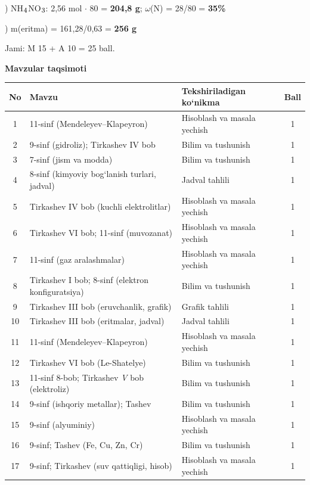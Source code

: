 \documentclass[11pt,a4paper]{article}
\renewcommand{\textsubscript}[1]{\ensuremath{_{\text{\fontsize{8}{8}\selectfont #1}}}}
\begin{document}
) NH\textsubscript{4}NO\textsubscript{3}: 2,56 mol $\cdot$ 80 = \textbf{204,8 g}; $\omega$(N) = 28/80 = \textbf{35\%}\par
{}) m(eritma) = 161,28/0,63 = \textbf{256 g}\par
\noindent Jami: M 15 + A 10 = 25 ball.\par
\par\bigskip\noindent\textbf{Mavzular taqsimoti}\par\smallskip
{\small\noindent\begin{longtable}{|c|p{7.2cm}|p{5.4cm}|c|}\hline \textbf{No} & \textbf{Mavzu} & \textbf{Tekshiriladigan ko`nikma} & \textbf{Ball}\\\hline
1 & 11-sinf (Mendeleyev--Klapeyron) & Hisoblash va masala yechish & 1\\\hline
2 & 9-sinf (gidroliz); Tirkashev IV bob & Bilim va tushunish & 1\\\hline
3 & 7-sinf (jism va modda) & Bilim va tushunish & 1\\\hline
4 & 8-sinf (kimyoviy bog`lanish turlari, jadval) & Jadval tahlili & 1\\\hline
5 & Tirkashev IV bob (kuchli elektrolitlar) & Hisoblash va masala yechish & 1\\\hline
6 & Tirkashev VI bob; 11-sinf (muvozanat) & Hisoblash va masala yechish & 1\\\hline
7 & 11-sinf (gaz aralashmalar) & Hisoblash va masala yechish & 1\\\hline
8 & Tirkashev I bob; 8-sinf (elektron konfiguratsiya) & Bilim va tushunish & 1\\\hline
9 & Tirkashev III bob (eruvchanlik, grafik) & Grafik tahlili & 1\\\hline
10 & Tirkashev III bob (eritmalar, jadval) & Jadval tahlili & 1\\\hline
11 & 11-sinf (Mendeleyev--Klapeyron) & Hisoblash va masala yechish & 1\\\hline
12 & Tirkashev VI bob (Le-Shatelye) & Bilim va tushunish & 1\\\hline
13 & 11-sinf 8-bob; Tirkashev \textit{V} bob (elektroliz) & Bilim va tushunish & 1\\\hline
14 & 9-sinf (ishqoriy metallar); Tashev & Bilim va tushunish & 1\\\hline
15 & 9-sinf (alyuminiy) & Hisoblash va masala yechish & 1\\\hline
16 & 9-sinf; Tashev (Fe, Cu, Zn, Cr) & Bilim va tushunish & 1\\\hline
17 & 9-sinf; Tirkashev (suv qattiqligi, hisob) & Hisoblash va masala yechish & 1\\\hline

\end{longtable}}
\end{document}
